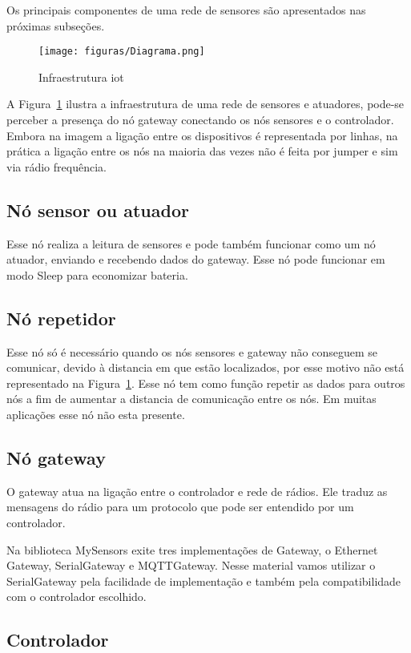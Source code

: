 Os principais componentes de uma rede de sensores são apresentados nas próximas subseções.

\begin{figure}[H]
      \centering
      \texttt{[image: figuras/Diagrama.png]}
      \caption{Infraestrutura iot}
      \label{fig:iot}
\end{figure}

A Figura~\ref{fig:iot} ilustra a infraestrutura de uma rede de sensores e atuadores, pode-se perceber a presença do nó gateway conectando os nós sensores e o controlador. Embora na imagem a ligação entre os dispositivos é representada por linhas, na prática a ligação entre os nós na maioria das vezes não é feita por jumper e sim via rádio frequência. 

\subsection{Nó sensor ou atuador}
	Esse nó realiza a leitura de sensores e pode também funcionar como um nó atuador, enviando e recebendo dados do gateway. Esse nó pode funcionar em modo Sleep para economizar bateria.

\subsection{Nó repetidor}
	Esse nó só é necessário quando os nós sensores e gateway não conseguem se comunicar, devido à distancia em que estão localizados, por esse motivo não está representado na Figura~\ref{fig:iot}. Esse nó tem como função repetir as dados para outros nós a fim de aumentar a distancia de comunicação entre os nós. Em muitas aplicações esse nó não esta presente.

\subsection{Nó gateway}

O gateway atua na ligação entre o controlador e rede de rádios. Ele traduz as mensagens do rádio para um protocolo que pode ser entendido por um controlador. 

Na biblioteca MySensors exite tres implementações de Gateway, o Ethernet Gateway, SerialGateway e MQTTGateway. Nesse material vamos utilizar o SerialGateway pela facilidade de implementação e também pela compatibilidade com o controlador escolhido.
	
\subsection{Controlador}

